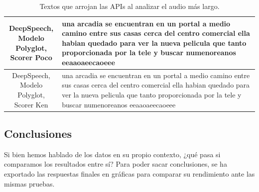 \begin{table}
\begin{tabularx}{\textwidth}{|c|X|}
		\makecell{DeepSpeech,\\ Modelo Polyglot,\\ Scorer Poco} & una arcadia se encuentran en un portal a medio camino entre sus casas cerca del centro comercial ella habian quedado para ver la nueva pelicula que tanto proporcionada por la tele y buscar numenoreanos eeaaoaeecaoeee \\ \hline
		\makecell{DeepSpeech,\\ Modelo Polyglot,\\ Scorer Ken} & una arcadia se encuentran en un portal a medio camino entre sus casas cerca del centro comercial ella habian quedado para ver la nueva pelicula que tanto proporcionada por la tele y buscar numenoreanos eeaaoaeecaoeee\\ \hline
		
	\end{tabularx}
	\caption{Textos que arrojan las APIs al analizar el audio más largo.}
	\label{tab:predicts}
\end{table}

\subsection{Conclusiones}

Si bien hemos hablado de los datos en su propio contexto, ¿qué pasa si comparamos los resultados entre sí? Para poder sacar conclusiones, se ha exportado las respuestas finales en gráficas para comparar su rendimiento ante las mismas pruebas.

